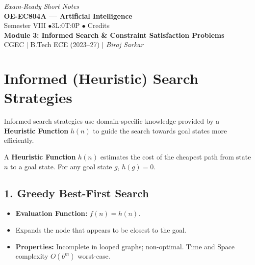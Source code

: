 \documentclass[12pt,a4paper]{article}
\begin{document}
\begin{center}
  \hfill \textit{Exam-Ready Short Notes} \\
  \vspace{6pt}
  {\LARGE\bfseries\color{myred} OE-EC804A --- Artificial Intelligence}\\[5pt]
  {\normalsize\color{mydark} Semester VIII \quad$\bullet$\quad 3L:0T:0P \quad$\bullet$ Credits}\\[3pt]
  {\normalsize\color{myteal}\textbf{Module 3: Informed Search \& Constraint Satisfaction Problems}}\\[3pt]
  {\small\color{mydark} CGEC \;$|$\; B.Tech ECE (2023--27) \;$|$\; \textit{Biraj Sarkar}}
\end{center}
\vspace{2pt}
\noindent{\color{myred}\rule{\linewidth}{1.5pt}}
\vspace{2pt}

\hypersetup{linkcolor=mydark}
\tableofcontents
\hypersetup{linkcolor=myteal}
\newpage

\section{Informed (Heuristic) Search Strategies}

Informed search strategies use domain-specific knowledge provided by a \textbf{Heuristic Function} $h(n)$ to guide the search towards goal states more efficiently.

\begin{tcolorbox}[defbox, title={Definition of a Heuristic Function}]
  A \textbf{Heuristic Function} $h(n)$ estimates the cost of the cheapest path from state $n$ to a goal state. For any goal state $g$, $h(g) = 0$.
\end{tcolorbox}

\subsection{1. Greedy Best-First Search}
\begin{itemize}[leftmargin=*, itemsep=3pt]
  \item \textbf{Evaluation Function:} $f(n) = h(n)$.
  \item Expands the node that appears to be closest to the goal.
  \item \textbf{Properties:} Incomplete in looped graphs; non-optimal. Time and Space complexity $O(b^m)$ worst-case.
\end{itemize}
\end{document}
